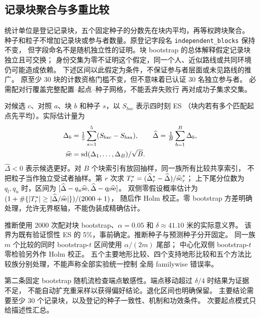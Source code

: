 \documentclass[UTF8,11pt]{ctexart}
\begin{document}
\subsection{记录块聚合与多重比较}
统计单位是登记记录块，五个固定种子的分数先在块内平均，再等权跨块聚合。
种子和粒子不增加记录块或参与者数量。原登记字段名 \texttt{independent\_blocks} 保持不变，
但字段命名不是随机独立性的证明。块 bootstrap 的总体解释假定记录块独立且可交换；
身份交集为零不证明这个假定，同一个人、近似路线或共同环境仍可能造成依赖。
下述区间以此假定为条件，不保证参与者层面或未见路线的推广。
原至少 30 块的计数资格门槛不变，但不意味着已认证 30 名独立参与者。
必需配对行覆盖完整配置--起点--种子网格，不能丢弃失败行
再对成功子集求交集。

对候选 \(c\)、对照 \(a\)、块 \(b\) 和种子 \(s\)，以 \(S_{bsc}\) 表示四时刻 ES
（块内若有多个匹配起点先平均）。实际估计量为
\begin{equation}
\begin{aligned}
\Delta_b&=\tfrac15\sum_{s=1}^5(S_{bsc}-S_{bsa}),\qquad
\widehat\Delta=\tfrac1B\sum_{b=1}^B\Delta_b,\\
\widehat{\rm se}&={\rm sd}(\Delta_1,\ldots,\Delta_B)/\sqrt B.
\end{aligned}
\label{eq:paired-estimand}
\end{equation}
\(\widehat\Delta<0\) 表示候选更好。对 \(B\) 个块索引有放回抽样，同一族所有比较共享索引，
不把粒子当作独立受试者抽样。第 \(r\) 次求
\(T_r^*=(\widehat\Delta_r^*-\widehat\Delta)/\widehat{\rm se}_r^*\)；
上下尾分位数为 \(q_l,q_u\) 时，区间为
\([\widehat\Delta-q_u\widehat{\rm se},\widehat\Delta-q_l\widehat{\rm se}]\)。
双侧零假设概率估计为
\((1+\#\{|T_r^*|\geq|\widehat\Delta/\widehat{\rm se}|\})/(2000+1)\)，
随后作 Holm 校正。零 bootstrap 方差明确处理，允许无界枢轴，不能伪装成精确估计。

推断使用 2000 次配对块 bootstrap、\(\alpha=0.05\) 和 \(\delta\approx41.10\) 米的实际意义界。
该界为既有验证惯性 ES 的 5\%，事前确定。推断种子与预测种子分开固定。
同一族 \(m\) 个比较的同时 bootstrap-\(t\) 区间使用 \(\alpha/(2m)\) 尾部；
中心化双侧 bootstrap-\(t\) 零检验另外作 Holm 校正。
五个主要地形比较、四个支持地形比较和五个方法比较族分别处理，不能声称全部实验统一控制
全局 familywise 错误率。

第二条固定 bootstrap 随机流检查端点敏感性。端点移动超过 \(\delta/4\) 时结果为证据不足，
不能自动扩充重采样以获得偏好结论。退化区间也明确保留。
主要结论需要至少 30 个记录块，以及登记的种子一致性、机制和功效条件。
次要起点模式只给描述性汇总。
\end{document}
